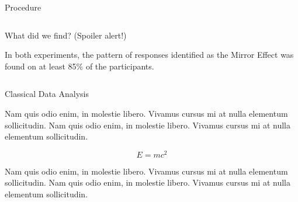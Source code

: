 \documentclass[final]{beamer}
\newlength{\onecolwid}
\newlength{\twocolwid}
\begin{document}
\begin{frame}[t]
\begin{columns}[t]
\begin{column}{\twocolwid}
\begin{columns}[t,totalwidth=\twocolwid]
\begin{column}{\onecolwid}
\begin{block}{Procedure}
\end{block}


\end{column} %

\end{columns} %


\begin{alertblock}{What did we find? (Spoiler alert!)}

In both experiments, the pattern of responses identified as the Mirror Effect was found on at least 85\% of the participants.

\end{alertblock} 


\begin{columns}[t,totalwidth=\twocolwid] %

\begin{column}{\onecolwid} %


\begin{block}{Classical Data Analysis}

Nam quis odio enim, in molestie libero. Vivamus cursus mi at nulla elementum sollicitudin. Nam quis odio enim, in molestie libero. Vivamus cursus mi at nulla elementum sollicitudin.
  
\begin{equation}
E = mc^{2}
\label{eqn:Einstein}
\end{equation}

Nam quis odio enim, in molestie libero. Vivamus cursus mi at nulla elementum sollicitudin. Nam quis odio enim, in molestie libero. Vivamus cursus mi at nulla elementum sollicitudin.


\end{block}
\end{column}
\end{columns}
\end{column}
\end{columns}
\end{frame}
\end{document}
